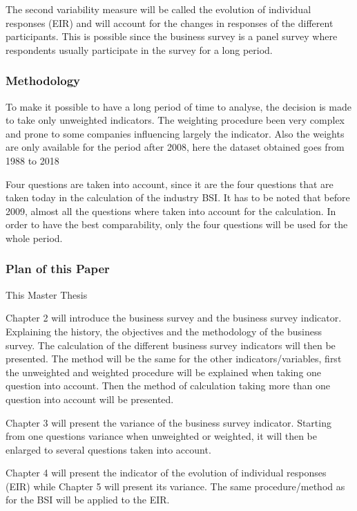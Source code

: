 \documentclass[12pt,a4paper,oneside]{book}
\begin{document}
The second variability measure will be called the evolution of individual responses (EIR) and will account for the changes in responses of the different participants. This is possible since the business survey is a panel survey where respondents usually participate in the survey for a long period.

\subsubsection{Methodology}


To make it possible to have a long period of time to analyse, the decision is made to take only unweighted indicators. The weighting procedure been very complex and prone to some companies influencing largely the indicator. Also the weights are only available for the period after 2008, here the dataset obtained goes from 1988 to 2018

Four questions are taken into account, since it are the four questions that are taken today in the calculation of the industry BSI. 
It has to be noted that before 2009, almost all the questions where taken into account for the calculation. In order to have the best comparability, only the four questions will be used for the whole period.

\subsubsection{Plan of this Paper}

This Master Thesis

Chapter 2 will introduce the business survey and the business survey indicator. Explaining the history, the objectives and the methodology of the business survey. The calculation of the different business survey indicators will then be presented. The method will be the same for the other indicators/variables, first the unweighted and weighted procedure will be explained when taking one question into account. Then the method of calculation taking more than one question into account will be presented.

Chapter 3 will present the variance of the business survey indicator. Starting from one questions variance when unweighted or weighted, it will then be enlarged to several questions taken into account.

Chapter 4 will present the indicator of the evolution of individual responses (EIR) while Chapter 5 will present its variance. The same procedure/method as for the BSI will be applied to the EIR.
\end{document}

